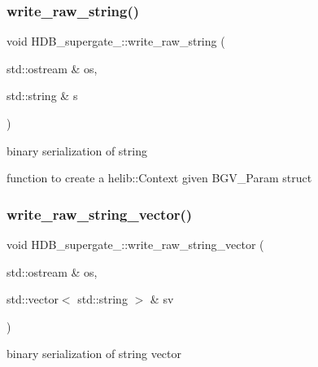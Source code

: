 \subsubsection{\texorpdfstring{write\+\_\+raw\+\_\+string()}{write\_raw\_string()}}
{\footnotesize\ttfamily void H\+D\+B\+\_\+supergate\+\_\+\+::write\+\_\+raw\+\_\+string (\begin{DoxyParamCaption}\item[{std\+::ostream \&}]{os,  }\item[{std\+::string \&}]{s }\end{DoxyParamCaption})}

binary serialization of string

function to create a helib\+::\+Context given B\+G\+V\+\_\+\+Param struct \mbox{\label{namespaceHDB__supergate___aaabeba84821bf0d2f399f7c69863924e}} 
\subsubsection{\texorpdfstring{write\+\_\+raw\+\_\+string\+\_\+vector()}{write\_raw\_string\_vector()}}
{\footnotesize\ttfamily void H\+D\+B\+\_\+supergate\+\_\+\+::write\+\_\+raw\+\_\+string\+\_\+vector (\begin{DoxyParamCaption}\item[{std\+::ostream \&}]{os,  }\item[{std\+::vector$<$ std\+::string $>$ \&}]{sv }\end{DoxyParamCaption})}

binary serialization of string vector 